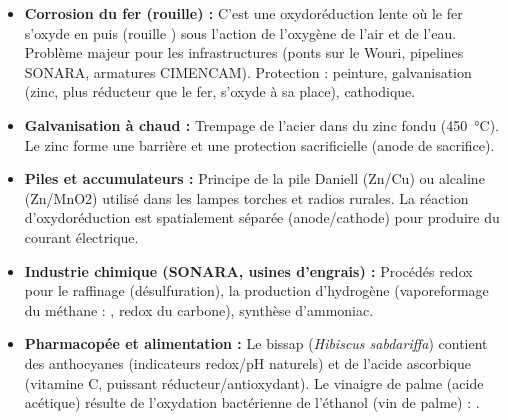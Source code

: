 \documentclass[11pt]{article}
\begin{document}
\begin{savaistu}
\begin{itemize}
\item \textbf{Corrosion du fer (rouille) :} C'est une oxydoréduction lente où le fer s'oxyde en  puis  (rouille ) sous l'action de l'oxygène de l'air et de l'eau. Problème majeur pour les infrastructures (ponts sur le Wouri, pipelines SONARA, armatures CIMENCAM). Protection : peinture, galvanisation (zinc, plus réducteur que le fer, s'oxyde à sa place), cathodique.
\item \textbf{Galvanisation à chaud :} Trempage de l'acier dans du zinc fondu (\SI{450}{\celsius}). Le zinc forme une barrière et une protection sacrificielle (anode de sacrifice).
\item \textbf{Piles et accumulateurs :} Principe de la pile Daniell (Zn/Cu) ou alcaline (Zn/MnO2) utilisé dans les lampes torches et radios rurales. La réaction d'oxydoréduction est spatialement séparée (anode/cathode) pour produire du courant électrique.
\item \textbf{Industrie chimique (SONARA, usines d'engrais) :} Procédés redox pour le raffinage (désulfuration), la production d'hydrogène (vaporeformage du méthane : , redox du carbone), synthèse d'ammoniac.
\item \textbf{Pharmacopée et alimentation :} Le bissap (\emph{Hibiscus sabdariffa}) contient des anthocyanes (indicateurs redox/pH naturels) et de l'acide ascorbique (vitamine C, puissant réducteur/antioxydant). Le vinaigre de palme (acide acétique) résulte de l'oxydation bactérienne de l'éthanol (vin de palme) : .
\end{itemize}
\end{savaistu}
\end{document}
